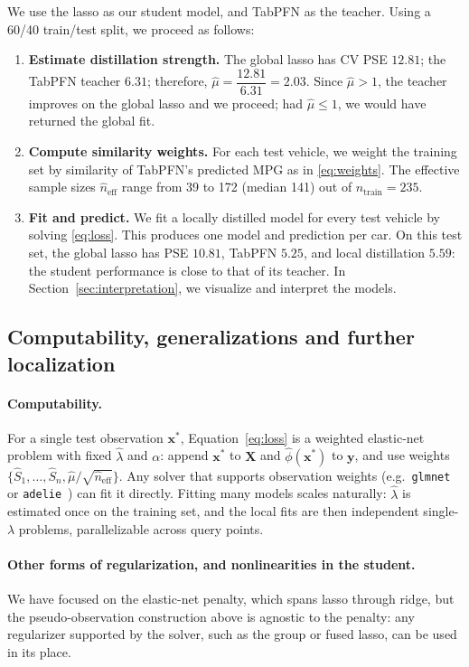 \documentclass[12pt]{article}
\theoremstyle{definition}
\begin{document}
We use the lasso as our student model, and TabPFN as the teacher. Using a 60/40 train/test split, we proceed as follows:
\begin{enumerate}
    \item \textbf{Estimate distillation strength.} The global lasso has CV PSE $12.81$; the TabPFN teacher $6.31$; therefore, $\hat\mu = \dfrac{12.81}{6.31} = 2.03$. Since $\hat\mu > 1$, the teacher improves on the global lasso and we proceed; had $\hat\mu \le 1$, we would have returned the global fit.
    \item \textbf{Compute similarity weights.} For each test vehicle, we weight the training set by similarity of TabPFN's predicted MPG as in \eqref{eq:weights}. The effective sample sizes $\hat n_{\text{eff}}$ range from 39 to 172 (median 141) out of $n_{\text{train}} = 235$.
    \item \textbf{Fit and predict.} We fit a locally distilled model for every test vehicle by solving \eqref{eq:loss}. This produces one model and prediction per car. On this test set, the global lasso has PSE $10.81$, TabPFN $5.25$, and local distillation $5.59$: the student performance is close to that of its teacher.  In Section~\ref{sec:interpretation}, we visualize and interpret the models.
\end{enumerate}

\subsection{Computability, generalizations and further localization}
\label{sec:generalization}

\paragraph{Computability.} For a single test observation $\bm{x}^*$, Equation~\eqref{eq:loss} is a weighted elastic-net problem with fixed $\hat\lambda$ and $\alpha$: append $\bm{x}^*$ to $\bm{X}$ and $\hat\phi(\bm{x}^*)$ to $\bm{y}$, and use weights $\{\hat S_1, \dots, \hat{S}_n, \hat\mu/\sqrt{\hat n_{\text{eff}}}\}$. Any solver that supports observation weights (e.g.\ \texttt{glmnet}~\cite{friedman2021package} or \texttt{adelie}~\cite{yang2024adelie}) can fit it directly. Fitting many models scales naturally: $\hat\lambda$ is estimated once on the training set, and the local fits are then independent single-$\lambda$ problems, parallelizable across query points.

\paragraph{Other forms of regularization, and nonlinearities in the student.} 
We have focused on the elastic-net penalty, which spans lasso through ridge, but the pseudo-observation construction above is agnostic to the penalty: any regularizer supported by the solver, such as the group or fused lasso, can be used in its place.
\end{document}
